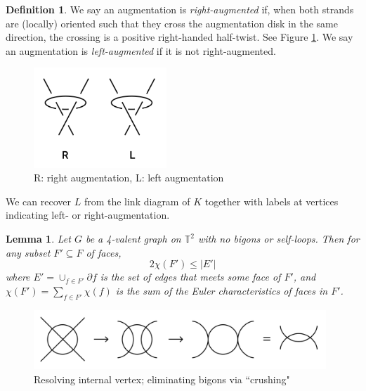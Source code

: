 \documentclass[11pt]{amsart}
\newcommand{\torus}{{\mathbb{T}^2}}
\newcommand{\del}{\partial}
\theoremstyle{plain}
\newtheorem{lemma}[theorem]{Lemma}
\theoremstyle{definition}
\newtheorem{define}[theorem]{Definition}
\begin{document}
\begin{define}
We say an augmentation is \emph{right-augmented} if, when both strands are
(locally) oriented such that they cross the augmentation disk in the same
direction, the crossing is a positive right-handed half-twist.
See Figure \ref{f:right_left_aug}.
We say an augmentation is \emph{left-augmented} if it is not right-augmented.
\end{define}

\begin{figure}
\includegraphics[width=5cm]{more_pictures/right_left_aug.png}
\caption{R: right augmentation, L: left augmentation}
\label{f:right_left_aug}
\end{figure}

We can recover $L$ from the link diagram of $K$
together with labels at vertices indicating left- or right-augmentation.


\begin{lemma}
\label{l:2fe}
Let $G$ be a 4-valent graph on $\torus$ with no bigons or self-loops.
Then for any subset $F' \subseteq F$ of faces,
\[
	2\chi(F') \leq |E'|
\]
where $E' = \cup_{f \in F'} \del f$ is the set of edges
that meets some face of $F'$,
and $\chi(F') = \sum_{f\in F'} \chi(f)$ is the sum
of the Euler characteristics of faces in $F'$.
\end{lemma}

\begin{figure}
\includegraphics[width=11cm]{bigon_crush}
\caption{Resolving internal vertex; eliminating bigons via ``crushing"}
\label{f:bigon_crush}
\end{figure}
\end{document}
